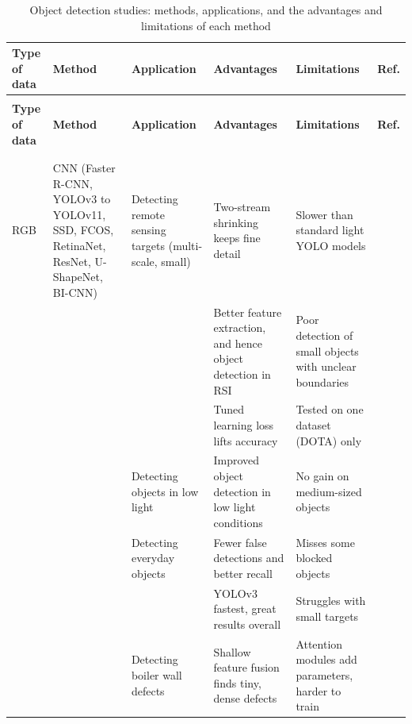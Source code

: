 {\scriptsize
\renewcommand{\arraystretch}{1.15}
\setlength{\tabcolsep}{3pt}
\begin{xltabular}{\textwidth}{>{\RaggedRight\arraybackslash}p{1.6cm}>{\RaggedRight\arraybackslash}p{2.2cm}>{\RaggedRight\arraybackslash}p{2.3cm}>{\RaggedRight\arraybackslash}X>{\RaggedRight\arraybackslash}Xp{0.95cm}}
\caption{Object detection studies: methods, applications, and the advantages and limitations of each method}\label{tab:detection-method}\\
\toprule
\textbf{Type of data} & \textbf{Method} & \textbf{Application} & \textbf{Advantages} & \textbf{Limitations} & \textbf{Ref.} \\
\midrule
\endfirsthead
{}\\
\toprule
\textbf{Type of data} & \textbf{Method} & \textbf{Application} & \textbf{Advantages} & \textbf{Limitations} & \textbf{Ref.} \\
\midrule
\endhead
\midrule{}\\
\endfoot
\bottomrule
{}\\
\endlastfoot
RGB & CNN (Faster R-CNN, YOLOv3 to YOLOv11, SSD, FCOS, RetinaNet, ResNet, U-ShapeNet, BI-CNN) & Detecting remote sensing targets (multi-scale, small) & Two-stream shrinking keeps fine detail & Slower than standard light YOLO models & \citep{Wang2026a} \\
 &  &  & Better feature extraction, and hence object detection in RSI & Poor detection of small objects with unclear boundaries & \citep{Zhang2024} \\
 &  &  & Tuned learning loss lifts accuracy & Tested on one dataset (DOTA) only & \citep{Lalitha2022} \\
 &  & Detecting objects in low light & Improved object detection in low light conditions & No gain on medium-sized objects & \citep{Wu2023} \\
 &  & Detecting everyday objects & Fewer false detections and better recall & Misses some blocked objects & \citep{Wu2026} \\
 &  &  & YOLOv3 fastest, great results overall & Struggles with small targets & \citep{Srivastava2021} \\
 &  & Detecting boiler wall defects & Shallow feature fusion finds tiny, dense defects & Attention modules add parameters, harder to train & \citep{Sun2022} \\

\end{xltabular}}
